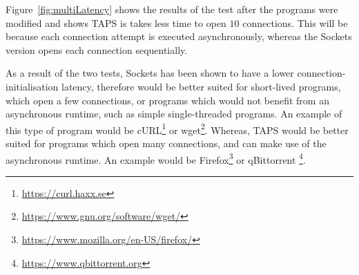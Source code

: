 Figure~\ref{fig:multiLatency} shows the results of the test after the programs were modified and shows TAPS is takes
less time to open \(10\) connections.
This will be because each connection attempt is executed asynchronously, whereas the Sockets version opens each
connection sequentially.

As a result of the two tests, Sockets has been shown to have a lower connection-initialisation latency, therefore would
be better suited for short-lived programs, which open a few connections, or programs which would not benefit from an
asynchronous runtime, such as simple single-threaded programs.
An example of this type of program would be cURL\footnote{\url{https://curl.haxx.se}} or
wget\footnote{\url{https://www.gnu.org/software/wget/}}.
Whereas, TAPS would be better suited for programs which open many connections, and can make use of the asynchronous
runtime.
An example would be Firefox\footnote{\url{https://www.mozilla.org/en-US/firefox/}} or qBittorrent
\footnote{\url{https://www.qbittorrent.org}}.


